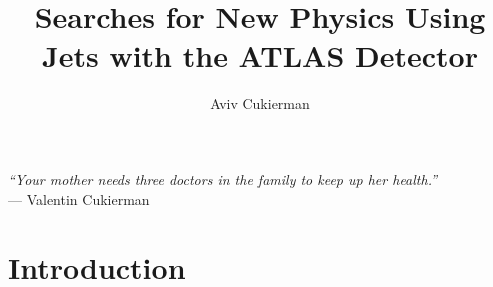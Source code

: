 \documentclass[12pt]{report}
\title{Searches for New Physics Using Jets with the ATLAS Detector}
\author{Aviv Cukierman}
\newenvironment{dedication}
  {\clearpage           %
   \thispagestyle{empty}%
   \vspace*{\stretch{1}}%
   \itshape             %
   \raggedleft          %
  }
  {\par %
   \vspace{\stretch{3}} %
   \clearpage           %
  }
\newcommand\blfootnote[1]{%
  \begingroup
  \renewcommand\thefootnote{}\footnote{#1}%
  \addtocounter{footnote}{-1}%
  \endgroup
}
\begin{document}
    \beforepreface



\clearpage
\begin{flushright}
\vspace{10mm}
{\it ``Your mother needs three doctors in the family to keep up her health.''}\\
{ --- Valentin Cukierman}\\
\end{flushright}
\clearpage

\newpage



\afterpreface

\chapter{Introduction}
\label{ch:intro}

\end{document}
